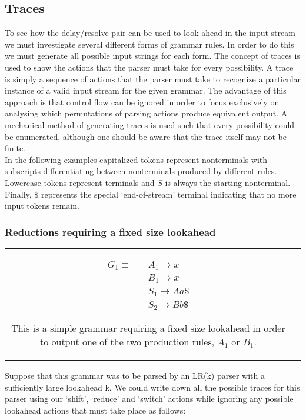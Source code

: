 \documentclass[a4paper,11pt]{article}
\begin{document}
\subsection{Traces}
To see how the delay/resolve pair can be used to look ahead in the input stream we must investigate several different forms of grammar rules.
In order to do this we must generate all possible input strings for each form. 
The concept of traces is used to show the actions that the parser must take for every possibility. 
A trace is simply a sequence of actions that the parser must take to recognize a particular instance of a valid input stream for the given grammar.
The advantage of this approach is that control flow can be ignored in order to focus exclusively on analysing which permutations of parsing actions produce equivalent output.
A mechanical method of generating traces is used such that every possibility could be enumerated, although one should be aware that the trace itself may not be finite.\\

In the following examples capitalized tokens represent nonterminals with subscripts differentiating between nonterminals produced by different rules. 
Lowercase tokens represent terminals and $S$ is always the starting nonterminal. 
Finally, $\$$ represents the special `end-of-stream' terminal indicating that no more input tokens remain.\\

\subsubsection{Reductions requiring a fixed size lookahead}
\begin{tabular}[t]{cl}
\parbox{.3\textwidth}{
\begin{align*}
G_1 \equiv \quad & A_1 \rightarrow x\\
                 & B_1 \rightarrow x\\
                 & S_1 \rightarrow A a \$\\
                 & S_2 \rightarrow B b \$
\end{align*}}
\parbox{.8\textwidth}{This is a simple grammar requiring a fixed size lookahead in order to output one of the two production rules, $A_1$ or $B_1$.}
\end{tabular}

Suppose that this grammar was to be parsed by an LR(k) parser with a sufficiently large lookahead k. 
We could write down all the possible traces for this parser using our `shift', `reduce' and `switch' actions while ignoring any possible lookahead actions that must take place as follows:
\end{document}
